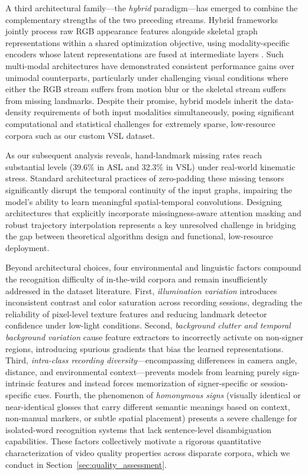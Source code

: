 \documentclass{ieeeaccess}
\begin{document}
A third architectural family—the \textit{hybrid} paradigm—has emerged to combine the complementary strengths of the two preceding streams. Hybrid frameworks jointly process raw RGB appearance features alongside skeletal graph representations within a shared optimization objective, using modality-specific encoders whose latent representations are fused at intermediate layers \cite{yin2020signbert}. Such multi-modal architectures have demonstrated consistent performance gains over unimodal counterparts, particularly under challenging visual conditions where either the RGB stream suffers from motion blur or the skeletal stream suffers from missing landmarks. Despite their promise, hybrid models inherit the data-density requirements of both input modalities simultaneously, posing significant computational and statistical challenges for extremely sparse, low-resource corpora such as our custom VSL dataset.

As our subsequent analysis reveals, hand-landmark missing rates reach substantial levels (39.6$\%$ in ASL and 32.3$\%$ in VSL) under real-world kinematic stress. Standard architectural practices of zero-padding these missing tensors significantly disrupt the temporal continuity of the input graphs, impairing the model's ability to learn meaningful spatial-temporal convolutions. Designing architectures that explicitly incorporate missingness-aware attention masking and robust trajectory interpolation represents a key unresolved challenge in bridging the gap between theoretical algorithm design and functional, low-resource deployment.

Beyond architectural choices, four environmental and linguistic factors compound the recognition difficulty of in-the-wild corpora and remain insufficiently addressed in the dataset literature. First, \textit{illumination variation} introduces inconsistent contrast and color saturation across recording sessions, degrading the reliability of pixel-level texture features and reducing landmark detector confidence under low-light conditions. Second, \textit{background clutter and temporal background variation} cause feature extractors to incorrectly activate on non-signer regions, introducing spurious gradients that bias the learned representations. Third, \textit{intra-class recording diversity}—encompassing differences in camera angle, distance, and environmental context—prevents models from learning purely sign-intrinsic features and instead forces memorization of signer-specific or session-specific cues. Fourth, the phenomenon of \textit{homonymous signs} (visually identical or near-identical glosses that carry different semantic meanings based on context, non-manual markers, or subtle spatial placement) presents a severe challenge for isolated-word recognition systems that lack sentence-level disambiguation capabilities. These factors collectively motivate a rigorous quantitative characterization of video quality properties across disparate corpora, which we conduct in Section~\ref{sec:quality_assessment}.
\end{document}
